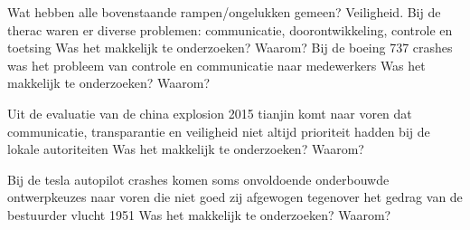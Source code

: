 \begin{thebibliography}{99}
{{%


Wat hebben alle bovenstaande rampen/ongelukken gemeen? Veiligheid.
Bij de therac waren er diverse problemen: communicatie, doorontwikkeling, controle en toetsing
Was het makkelijk te onderzoeken? Waarom?
Bij de boeing 737 crashes was het probleem van controle en communicatie naar medewerkers
Was het makkelijk te onderzoeken? Waarom?

Uit de evaluatie van de china explosion 2015 tianjin komt naar voren dat communicatie, transparantie en veiligheid niet altijd prioriteit hadden bij de lokale autoriteiten
Was het makkelijk te onderzoeken? Waarom?

Bij de tesla autopilot crashes komen soms onvoldoende onderbouwde ontwerpkeuzes naar voren die niet goed zij  afgewogen tegenover het gedrag van de bestuurder
vlucht 1951
Was het makkelijk te onderzoeken? Waarom?

}}
\end{thebibliography}
